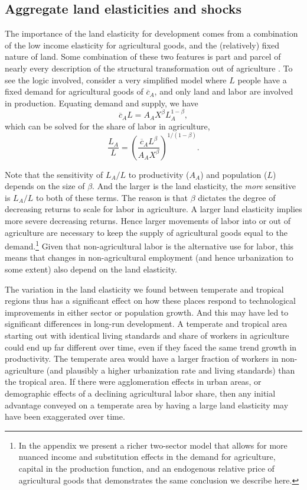 \documentclass[11pt]{article}
\begin{document}
\subsection{Aggregate land elasticities and shocks}
The importance of the land elasticity for development comes from a combination of the low income elasticity for agricultural goods, and the (relatively) fixed nature of land. Some combination of these two features is part and parcel of nearly every description of the structural transformation out of agriculture \citep{kp2001,Gollin:2007oq,Restuccia:2008hc,Gollin:2010ys,vollrath2011,Alvarez-Cuadrado:2011nx,hrv2014,duarte2010role}. To see the logic involved, consider a very simplified model where $L$ people have a fixed demand for agricultural goods of $\overline{c}_A$, and only land and labor are involved in production. Equating demand and supply, we have
\begin{equation}
	\overline{c}_A L = A_A X^{\beta} L_A^{1-\beta},
\end{equation}
which can be solved for the share of labor in agriculture,
\begin{equation}
	\frac{L_A}{L} = \left(\frac{\overline{c}_A L^{\beta}}{A_A X^{\beta}}\right)^{1/(1-\beta)}.
\end{equation}

Note that the sensitivity of $L_A/L$ to productivity ($A_A$) and population ($L$) depends on the size of $\beta$. And the larger is the land elasticity, the \textit{more} sensitive is $L_A/L$ to both of these terms. The reason is that $\beta$ dictates the degree of decreasing returns to scale for labor in agriculture. A larger land elasticity implies more severe decreasing returns. Hence larger movements of labor into or out of agriculture are necessary to keep the supply of agricultural goods equal to the demand.\footnote{In the appendix we present a richer two-sector model that allows for more nuanced income and substitution effects in the demand for agriculture, capital in the production function, and an endogenous relative price of agricultural goods that demonstrates the same conclusion we describe here.} Given that non-agricultural labor is the alternative use for labor, this means that changes in non-agricultural employment (and hence urbanization to some extent) also depend on the land elasticity. 

The variation in the land elasticity we found between temperate and tropical regions thus has a significant effect on how these places respond to technological improvements in either sector or population growth. And this may have led to significant differences in long-run development. A temperate and tropical area starting out with identical living standards and share of workers in agriculture could end up far different over time, even if they faced the same trend growth in productivity. The temperate area would have a larger fraction of workers in non-agriculture (and plausibly a higher urbanization rate and living standards) than the tropical area. If there were agglomeration effects in urban areas, or demographic effects of a declining agricultural labor share, then any initial advantage conveyed on a temperate area by having a large land elasticity may have been exaggerated over time.
\end{document}
